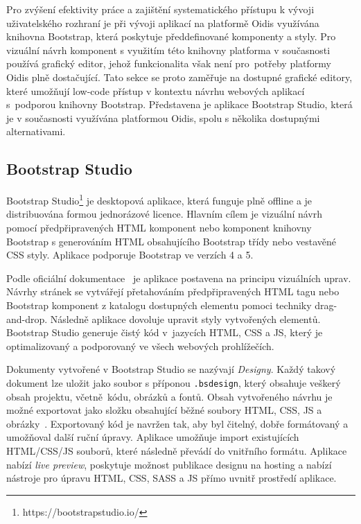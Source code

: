Pro zvýšení efektivity práce a zajištění systematického přístupu k vývoji 
uživatelského rozhraní je při vývoji aplikací na platformě Oidis využívána 
knihovna Bootstrap, která poskytuje předdefinované komponenty a styly. Pro vizuální návrh komponent s využitím této knihovny platforma v současnosti 
používá grafický editor, jehož funkcionalita však není pro~potřeby platformy Oidis plně dostačující. Tato sekce se proto zaměřuje na dostupné grafické editory, které umožňují low-code přístup v kontextu návrhu webových aplikací s~podporou knihovny Bootstrap. Představena je aplikace Bootstrap Studio, která je v současnosti využívána platformou Oidis, spolu s několika dostupnými alternativami.

\subsection{Bootstrap Studio}
\label{BootstrapStudio}
Bootstrap Studio\footnote{https://bootstrapstudio.io/} je desktopová aplikace, která funguje plně offline a je distribuována formou jednorázové licence. Hlavním cílem je vizuální návrh pomocí předpřipravených HTML komponent nebo komponent knihovny Bootstrap s generováním HTML obsahujícího Bootstrap třídy nebo vestavěné CSS styly. Aplikace podporuje Bootstrap ve verzích 4 a 5.

Podle oficiální dokumentace~\cite{BootstrapStudioDocs} je aplikace postavena na principu vizuálních uprav. Návrhy stránek se vytvářejí přetahováním předpřipravených HTML tagu nebo Bootstrap komponent z katalogu dostupných elementu pomoci techniky drag-and-drop. Následně aplikace dovoluje upravit styly vytvořených elementů. Bootstrap Studio generuje čistý kód v~jazycích HTML, CSS a JS, který je optimalizovaný a podporovaný ve všech webových prohlížečích. 

Dokumenty vytvořené v Bootstrap Studio se nazývají \textit{Designy}. Každý takový dokument lze uložit jako soubor s příponou \texttt{.bsdesign}, který obsahuje veškerý obsah projektu, včetně~kódu, obrázků a fontů. Obsah vytvořeného návrhu je možné exportovat jako složku obsahující běžné soubory HTML, CSS, JS a obrázky~\cite{BootstrapStudioDocs}. Exportovaný kód je navržen tak, aby byl čitelný, dobře formátovaný a umožňoval další ruční úpravy. Aplikace umožňuje import existujících HTML/CSS/JS souborů, které následně převádí do vnitřního formátu. Aplikace nabízí \textit{live preview}, poskytuje možnost publikace designu na hosting a nabízí nástroje pro úpravu HTML, CSS, SASS a JS přímo uvnitř prostředí aplikace. 

